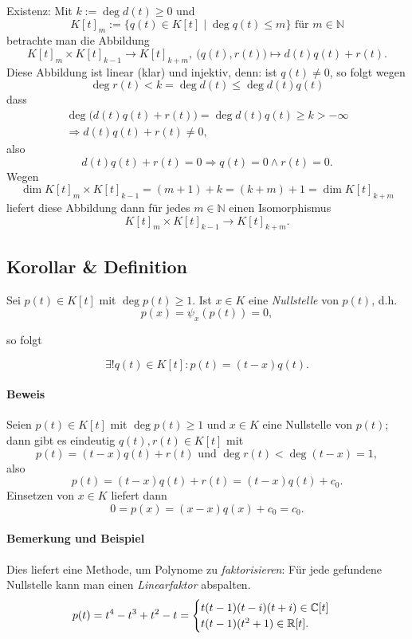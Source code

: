	Existenz: Mit $ k := \deg d(t) \geq 0 $ und
		\[ K[t]_m := \{q(t)\in K[t]\mid \deg q(t)\leq m \} \text{ für }m\in \mathbb{N} \]
	betrachte man die Abbildung
		\[ K[t]_m \times K[t]_{k-1}\to K[t]_{k+m},\ \big(q(t), r(t)\big) \mapsto d(t)q(t)+r(t). \]
	Diese Abbildung ist linear (klar) und injektiv, denn:
	ist $ q(t) \neq 0 $, so folgt wegen
		\[ \deg r(t) < k = \deg d(t)\leq \deg d(t)q(t) \]
	dass %
		\begin{gather*}
			\deg \big(d(t)q(t) + r(t)\big) = \deg d(t)q(t)\geq k > -\infty\\
			\Rightarrow d(t)q(t)+r(t)\neq 0,
		\end{gather*}
	also
		\[ d(t)q(t)+r(t)=0 \Rightarrow q(t)=0 \land r(t) = 0. \] %
	Wegen
		\[ \dim K[t]_m \times K[t]_{k-1} = (m+1) + k = (k+m) + 1 = \dim K[t]_{k+m} \]
	liefert diese Abbildung dann für jedes $ m\in \mathbb{N} $ einen Isomorphismus
		\[ K[t]_m \times K[t]_{k-1} \to K[t]_{k+m}. \]
\subsection{Korollar \& Definition}
	\begin{Definition}[Nullstelle]
	Sei $ p(t)\in K[t] $ mit $ \deg p(t)\geq 1 $. Ist $ x\in K $ eine \emph{Nullstelle} von $ p(t) $, d.h.
		\[ p(x) = \psi_x(p(t)) = 0, \]
	\end{Definition}
	so folgt
	\begin{Korollar}
		\[ \exists! q(t)\in K[t]: p(t) = (t-x) q(t). \]
	\end{Korollar}
\paragraph{Beweis}
	Seien $ p(t)\in K[t] $ mit $ \deg p(t) \geq 1 $ und $ x\in K $ eine Nullstelle von $ p(t) $; dann gibt es eindeutig $ q(t),r(t) \in K[t] $ mit
		\[ p(t) = (t-x) q(t) + r(t) \text{ und } \deg r(t) < \deg (t-x) = 1, \]
	also
		\[ p(t) = (t-x)q(t)+r(t) = (t-x)q(t)+c_0. \]
	Einsetzen von $ x\in K $ liefert dann
		\[ 0 = p(x) = (x-x)q(x) + c_0 = c_0. \]
\paragraph{Bemerkung und Beispiel}
	Dies liefert eine Methode, um Polynome zu \emph{faktorisieren}: Für jede gefundene Nullstelle kann man einen \emph{Linearfaktor} abspalten.
		\[ p(t)= t^4-t^3+t^2-t =
			\begin{cases}
				t(t-1)(t-i)(t+i) \in \mathbb{C}[t]\\
				t(t-1)(t^2+1) \in \mathbb{R}[t].
			\end{cases} \]

